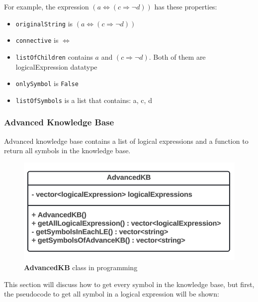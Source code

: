 \documentclass{assignment}
\begin{document}
For example, the expression $(a \iff (c \Rightarrow \neg d))$ has these properties: 

\begin{itemize}
\item \texttt{originalString} is $(a \iff (c \Rightarrow \neg d))$
	\item \texttt{connective} is $\iff$
	\item \texttt{listOfChildren} contains $a$ and $(c \Rightarrow \neg d)$. Both of them are logicalExpression datatype
	\item \texttt{onlySymbol} is \texttt{False}
	\item \texttt{listOfSymbols} is a list that contains: a, c, d
\end{itemize}

\subsubsection{Advanced Knowledge Base}
Advanced knowledge base contains a list of logical expressions and a function to return all symbols in the knowledge base.

\begin{figure}[h]
    \centering
    \includegraphics[width=1\textwidth]{./assets/AdvancedKB.png}
    \caption{\textbf{AdvancedKB} class in programming}
    \label{fig:fig13}
\end{figure}

\newpage
This section will discuss how to get every symbol in the knowledge base, but first, the pseudocode to get all symbol in a logical expression will be shown:
\end{document}
